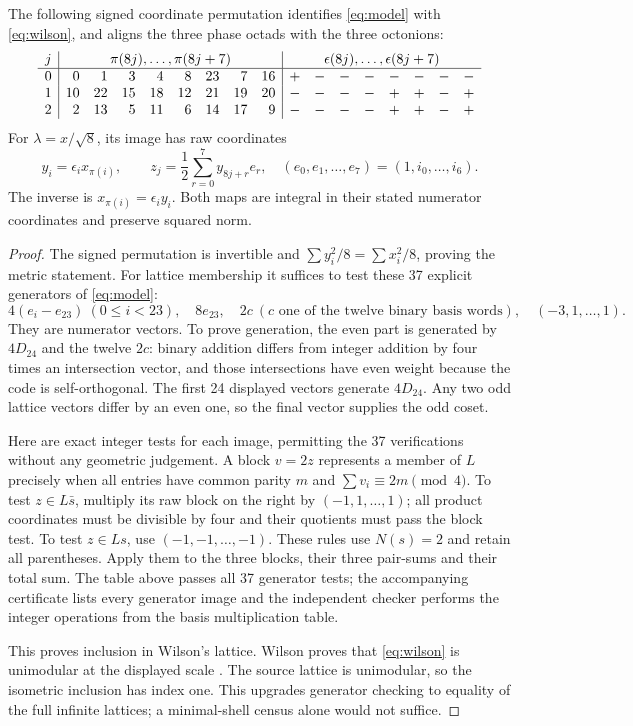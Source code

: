 \begin{theorem}\label{thm:isometry}
The following signed coordinate permutation identifies \eqref{eq:model} with \eqref{eq:wilson}, and aligns the three phase octads with the three octonions:
\[
\begin{array}{c|rrrrrrrr|rrrrrrrr}
j&\multicolumn{8}{c|}{\pi(8j),\ldots,\pi(8j+7)}&\multicolumn{8}{c}{\epsilon(8j),\ldots,\epsilon(8j+7)}\\\hline
0&0&1&3&4&8&23&7&16&+&-&-&-&-&-&-&-\\
1&10&22&15&18&12&21&19&20&-&-&-&-&+&+&-&+\\
2&2&13&5&11&6&14&17&9&-&-&-&-&+&+&-&+
\end{array}
\]
For $\lambda=x/\sqrt8$, its image has raw coordinates
\[
y_i=\epsilon_i x_{\pi(i)},\qquad
z_j=\frac12\sum_{r=0}^7y_{8j+r}e_r,
\quad(e_0,e_1,\ldots,e_7)=(1,i_0,\ldots,i_6).
\]
The inverse is $x_{\pi(i)}=\epsilon_i y_i$. Both maps are integral in their stated numerator coordinates and preserve squared norm.
\end{theorem}
\begin{proof}
The signed permutation is invertible and $\sum y_i^2/8=\sum x_i^2/8$, proving the metric statement. For lattice membership it suffices to test these 37 explicit generators of \eqref{eq:model}:
\[
4(e_i-e_{23})\ (0\le i<23),\quad8e_{23},\quad
2c\ (c\text{ one of the twelve binary basis words}),\quad
(-3,1,\ldots,1).
\]
They are numerator vectors. To prove generation, the even part is generated by $4D_{24}$ and the twelve $2c$: binary addition differs from integer addition by four times an intersection vector, and those intersections have even weight because the code is self-orthogonal. The first 24 displayed vectors generate $4D_{24}$. Any two odd lattice vectors differ by an even one, so the final vector supplies the odd coset.

Here are exact integer tests for each image, permitting the 37 verifications without any geometric judgement. A block $v=2z$ represents a member of $L$ precisely when all entries have common parity $m$ and $\sum v_i\equiv2m\pmod4$. To test $z\in L\bar s$, multiply its raw block on the right by $(-1,1,\ldots,1)$; all product coordinates must be divisible by four and their quotients must pass the block test. To test $z\in Ls$, use $(-1,-1,\ldots,-1)$. These rules use $N(s)=2$ and retain all parentheses. Apply them to the three blocks, their three pair-sums and their total sum. The table above passes all 37 generator tests; the accompanying certificate lists every generator image and the independent checker performs the integer operations from the basis multiplication table.

This proves inclusion in Wilson's lattice. Wilson proves that \eqref{eq:wilson} is unimodular at the displayed scale \cite[Sections 3--4]{wilson}. The source lattice is unimodular, so the isometric inclusion has index one. This upgrades generator checking to equality of the full infinite lattices; a minimal-shell census alone would not suffice.
\end{proof}
